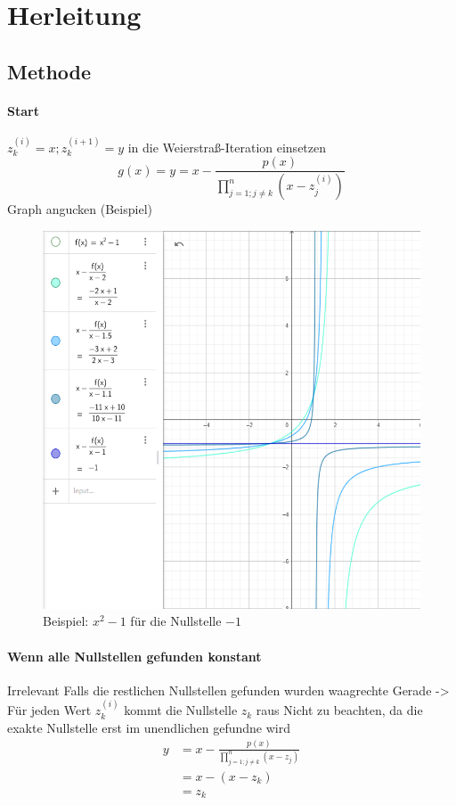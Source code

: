 \documentclass{article}
\begin{document}
\section{Herleitung}

\subsection{Methode}
\paragraph{Start}
$z_k^{(i)} = x;z_k^{(i+1)} = y$ in die Weierstraß-Iteration einsetzen 
\begin{equation}
    g(x) = y = x - \frac{p(x)}{\prod_{j=1;j\neq k}^{n} (x-z_j^{(i)})}
\end{equation}
Graph angucken (Beispiel)
\begin{figure}[h]
    \centering
    \includegraphics[scale=.6]{BeispielHerleitung.png}
    \caption{Beispiel: $x^2-1$ für die Nullstelle $-1$}
\end{figure}
\paragraph{Wenn alle Nullstellen gefunden konstant} Irrelevant
Falls die restlichen Nullstellen gefunden wurden waagrechte Gerade -> Für jeden Wert $z_k^(i)$ kommt die Nullstelle $z_k$ raus
Nicht zu beachten, da die exakte Nullstelle erst im unendlichen gefundne wird
\begin{align*}
    y &= x - \frac{p(x)}{\prod_{j=1;j\neq k}^{n} (x-z_j)} \\
    &= x - (x-z_k) \\
    &= z_k
\end{align*}
\end{document}
